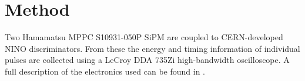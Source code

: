 \section{Method}
Two Hamamatsu MPPC S10931-050P SiPM are coupled to CERN-developed NINO discriminators. From these the energy and timing information of individual pulses are collected using a LeCroy DDA 735Zi high-bandwidth oscilloscope. A full description of the electronics used can be found in \cite{arron_Meyer_Pauwels_Lecoq_2012}.